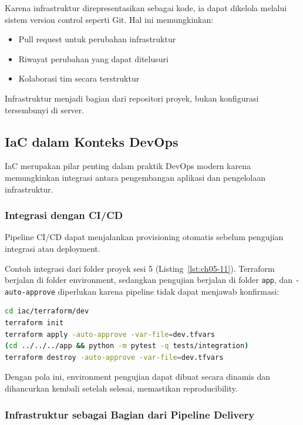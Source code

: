 Karena infrastruktur direpresentasikan sebagai kode, ia dapat dikelola melalui sistem version control seperti Git. Hal ini memungkinkan:

\begin{itemize}
\item Pull request untuk perubahan infrastruktur
\item Riwayat perubahan yang dapat ditelusuri
\item Kolaborasi tim secara terstruktur
\end{itemize}

Infrastruktur menjadi bagian dari repositori proyek, bukan konfigurasi tersembunyi di server.

\subsection{IaC dalam Konteks DevOps}

IaC merupakan pilar penting dalam praktik DevOps modern karena memungkinkan integrasi antara pengembangan aplikasi dan pengelolaan infrastruktur.

\subsubsection*{Integrasi dengan CI/CD}

Pipeline CI/CD dapat menjalankan provisioning otomatis sebelum pengujian integrasi atau deployment.

Contoh integrasi dari folder proyek sesi 5 (Listing~\ref{lst:ch05-11}). Terraform berjalan di folder environment, sedangkan pengujian berjalan di folder \texttt{app}, dan \texttt{-auto-approve} diperlukan karena pipeline tidak dapat menjawab konfirmasi:

\begin{lstlisting}[language=bash, caption={Langkah pipeline: provisioning, uji integrasi, lalu destroy}, label={lst:ch05-11}]
cd iac/terraform/dev
terraform init
terraform apply -auto-approve -var-file=dev.tfvars
(cd ../../../app && python -m pytest -q tests/integration)
terraform destroy -auto-approve -var-file=dev.tfvars
\end{lstlisting}

Dengan pola ini, environment pengujian dapat dibuat secara dinamis dan dihancurkan kembali setelah selesai, memastikan reproducibility.

\subsubsection*{Infrastruktur sebagai Bagian dari Pipeline Delivery}


